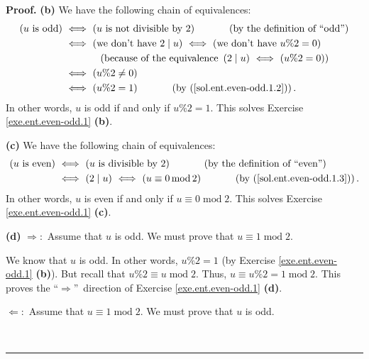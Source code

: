 \documentclass[numbers=enddot,12pt,final,onecolumn,notitlepage]{scrartcl}%
\numberwithin{exer}{subsection}
\theoremstyle{definition}
\newenvironment{fineprint}{\begin{small}}{\end{small}}
\newenvironment{proof}[1][Proof]{\noindent\textbf{#1.} }{\ \rule{0.5em}{0.5em}}
\begin{document}
\begin{fineprint}
\begin{proof}
\textbf{(b)} We have the following chain of equivalences:%
\begin{align}
\left(  u\text{ is odd}\right)  \  &  \Longleftrightarrow\ \left(  u\text{ is
not divisible by }2\right)  \ \ \ \ \ \ \ \ \ \ \left(  \text{by the
definition of \textquotedblleft odd\textquotedblright}\right) \nonumber\\
&  \Longleftrightarrow\ \left(  \text{we don't have }2\mid u\right)
\ \Longleftrightarrow\ \left(  \text{we don't have }u\%2=0\right) \nonumber\\
&  \ \ \ \ \ \ \ \ \ \ \left(  \text{because of the equivalence }\left(  2\mid
u\right)  \ \Longleftrightarrow\ \left(  u\%2=0\right)  \right) \nonumber\\
&  \Longleftrightarrow\ \left(  u\%2\neq0\right)
\label{sol.ent.even-odd.1.b.1}\\
&  \Longleftrightarrow\ \left(  u\%2=1\right)  \ \ \ \ \ \ \ \ \ \ \left(
\text{by (\ref{sol.ent.even-odd.1.2})}\right)  .\nonumber
\end{align}
In other words, $u$ is odd if and only if $u\%2=1$. This solves Exercise
\ref{exe.ent.even-odd.1} \textbf{(b)}.

\textbf{(c)} We have the following chain of equivalences:%
\begin{align*}
\left(  u\text{ is even}\right)  \  &  \Longleftrightarrow\ \left(  u\text{ is
divisible by }2\right)  \ \ \ \ \ \ \ \ \ \ \left(  \text{by the definition of
\textquotedblleft even\textquotedblright}\right) \\
&  \Longleftrightarrow\ \left(  2\mid u\right)  \ \Longleftrightarrow\ \left(
u\equiv0\operatorname{mod}2\right)  \ \ \ \ \ \ \ \ \ \ \left(  \text{by
(\ref{sol.ent.even-odd.1.3})}\right)  .
\end{align*}
In other words, $u$ is even if and only if $u\equiv0\operatorname{mod}2$. This
solves Exercise \ref{exe.ent.even-odd.1} \textbf{(c)}.

\textbf{(d)} $\Longrightarrow:$ Assume that $u$ is odd. We must prove that
$u\equiv1\operatorname{mod}2$.

We know that $u$ is odd. In other words, $u\%2=1$ (by Exercise
\ref{exe.ent.even-odd.1} \textbf{(b)}). But recall that $u\%2\equiv
u\operatorname{mod}2$. Thus, $u\equiv u\%2=1\operatorname{mod}2$. This proves
the \textquotedblleft$\Longrightarrow$\textquotedblright\ direction of
Exercise \ref{exe.ent.even-odd.1} \textbf{(d)}.

$\Longleftarrow:$ Assume that $u\equiv1\operatorname{mod}2$. We must prove
that $u$ is odd.


\end{proof}
\end{fineprint}
\end{document}
